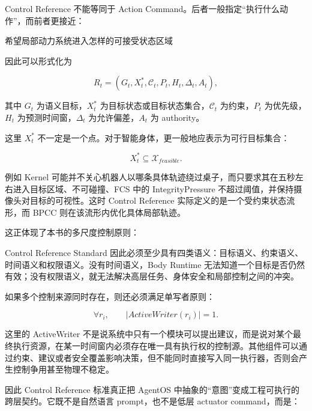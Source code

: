 Control Reference 不能等同于 Action Command。后者一般指定``执行什么动作''，而前者更接近：

\begin{statementbox}
希望局部动力系统进入怎样的可接受状态区域
\end{statementbox}

因此可以形式化为

\[
R_t
=
(
G_t,
X_t^\ast,
\mathcal C_t,
P_t,
H_t,
\Delta_t,
A_t
),
\]

其中 $G_t$ 为语义目标，$X_t^\ast$ 为目标状态或目标状态集合，$\mathcal C_t$ 为约束，$P_t$ 为优先级，$H_t$ 为预测时间窗，$\Delta_t$ 为允许偏差，$A_t$ 为 authority。

这里 $X_t^\ast$ 不一定是一个点。对于智能身体，更一般地应表示为可行目标集合：

\[
X_t^\ast
\subseteq
\mathcal X_{feasible}.
\]

例如 Kernel 可能并不关心机器人以哪条具体轨迹绕过桌子，而只要求其在五秒左右进入目标区域、不可碰撞、FCS 中的 IntegrityPressure 不超过阈值，并保持摄像头对目标的可视性。这时 Control Reference 实际定义的是一个受约束状态流形，而 BPCC 则在该流形内优化具体局部轨迹。

这正体现了本书的多尺度控制原则：

\begin{statementbox}
\centering
{}
\end{statementbox}

Control Reference Standard 因此必须至少具有四类语义：目标语义、约束语义、时间语义和权限语义。没有时间语义，Body Runtime 无法知道一个目标是否仍然有效；没有权限语义，就无法解决高层任务、身体安全和局部控制之间的冲突。

如果多个控制来源同时存在，则还必须满足单写者原则：

\[
\forall r_i,
\qquad
\left|
ActiveWriter(r_i)
\right|
=1.
\]

这里的 ActiveWriter 不是说系统中只有一个模块可以提出建议，而是说对某个最终执行资源，在某一时间窗内必须存在唯一具有执行权的控制源。其他组件可以通过约束、建议或者安全覆盖影响决策，但不能同时直接写入同一执行器，否则会产生控制争用甚至物理不稳定。

因此 Control Reference 标准真正把 AgentOS 中抽象的``意图''变成工程可执行的跨层契约。它既不是自然语言 prompt，也不是低层 actuator command，而是：

\begin{statementbox}
\centering
{}
\end{statementbox}

